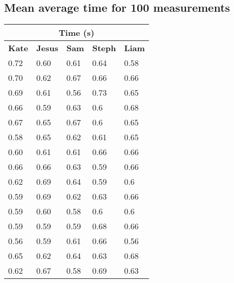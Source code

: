 \documentclass[11pt, letterpaper, includehead]{article}
\begin{document}
\subsection{Mean average time for 100 measurements} %
\begin{center}
  \begin{tabular}{|  m{2cm} | m{2cm} | m{2cm} | m{2cm} | m{2cm} | }
    \hline
    \multicolumn{5}{|c|}{\textbf{Time (s)}}\\
    \hline
    \textbf{Kate} & \textbf{Jesus} & \textbf{Sam} & \textbf{Steph} & \textbf{Liam} \\
    \hline
    0.72          & 0.60           & 0.61         & 0.64           & 0.58          \\
    \hline
    0.70          & 0.62           & 0.67         & 0.66           & 0.66          \\
    \hline
    0.69          & 0.61           & 0.56         & 0.73           & 0.65          \\
    \hline
    0.66          & 0.59           & 0.63         & 0.6            & 0.68          \\
    \hline
    0.67          & 0.65           & 0.67         & 0.6            & 0.65          \\
    \hline
    0.58          & 0.65           & 0.62         & 0.61           & 0.65          \\
    \hline
    0.60          & 0.61           & 0.61         & 0.66           & 0.66          \\
    \hline
    0.66          & 0.66           & 0.63         & 0.59           & 0.66          \\
    \hline
    0.62          & 0.69           & 0.64         & 0.59           & 0.6           \\
    \hline
    0.59          & 0.69           & 0.62         & 0.63           & 0.66          \\
    \hline
    0.59          & 0.60           & 0.58         & 0.6            & 0.6           \\
    \hline
    0.59          & 0.59           & 0.59         & 0.68           & 0.66          \\
    \hline
    0.56          & 0.59           & 0.61         & 0.66           & 0.56          \\
    \hline
    0.65          & 0.62           & 0.64         & 0.63           & 0.68          \\
    \hline
    0.62          & 0.67           & 0.58         & 0.69           & 0.63          \\

\end{tabular}
\end{center}
\end{document}
